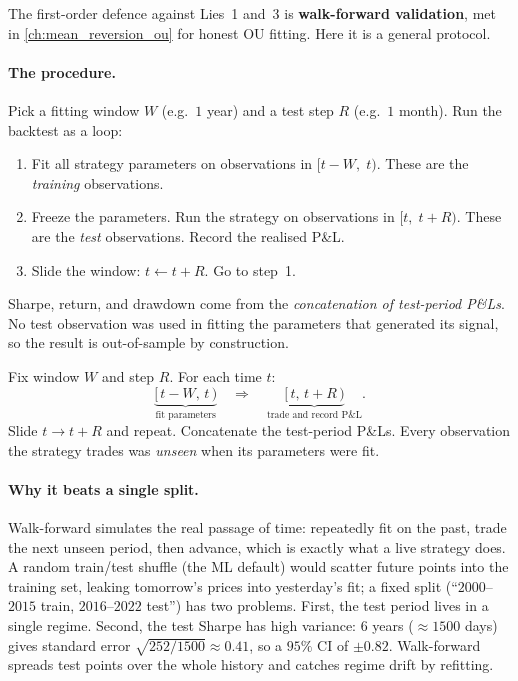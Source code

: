 The first-order defence against Lies~1 and~3 is \textbf{walk-forward
validation}, met in \cref{ch:mean_reversion_ou} for honest OU
fitting. Here it is a general protocol.

\paragraph{The procedure.} Pick a fitting window $W$ (e.g.\ $1$
year) and a test step $R$ (e.g.\ $1$ month). Run the backtest as
a loop:
\begin{enumerate}
  \item Fit all strategy parameters on observations in
  $[t - W,\; t)$. These are the \emph{training} observations.
  \item Freeze the parameters. Run the strategy on observations
  in $[t,\; t + R)$. These are the \emph{test} observations.
  Record the realised P\&L.
  \item Slide the window: $t \leftarrow t + R$. Go to step~1.
\end{enumerate}
Sharpe, return, and drawdown come from the \emph{concatenation of
test-period P\&Ls}. No test observation was used in fitting the
parameters that generated its signal, so the result is
out-of-sample by construction.

\begin{keyfactbox}
Fix window $W$ and step $R$. For each time $t$:
\[
\underbrace{[\,t - W,\, t\,)}_{\text{fit parameters}}
  \quad\Rightarrow\quad
\underbrace{[\,t,\, t + R\,)}_{\text{trade and record P\&L}}.
\]
Slide $t \to t + R$ and repeat. Concatenate the test-period
P\&Ls. Every observation the strategy trades was \emph{unseen}
when its parameters were fit.
\end{keyfactbox}

\paragraph{Why it beats a single split.} Walk-forward simulates the
real passage of time: repeatedly fit on the past, trade the next
unseen period, then advance, which is exactly what a live strategy does.
A random train/test shuffle (the ML default) would scatter future
points into the training set, leaking tomorrow's prices into
yesterday's fit; a fixed split
(``$2000$--$2015$ train, $2016$--$2022$ test'') has two problems.
First, the test period lives in a single regime. Second, the test
Sharpe has high variance: $6$ years ($\approx 1500$ days) gives
standard error $\sqrt{252/1500} \approx 0.41$, so a $95\%$ CI of
$\pm 0.82$. Walk-forward spreads test points over the whole history
and catches regime drift by refitting.

